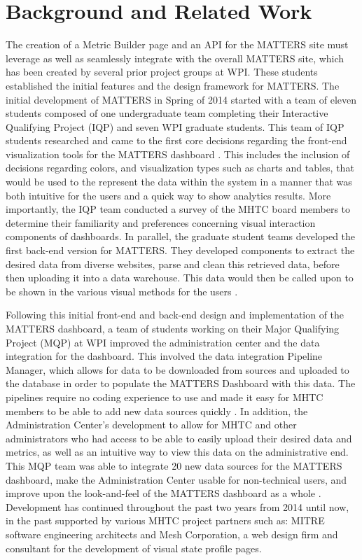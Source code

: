\chapter{Background and Related Work}

	The creation of a Metric Builder page and an API for the MATTERS site must 
	leverage as well as seamlessly integrate with the overall MATTERS site, 
	which has been created by several prior project groups at WPI. These 
	students established the initial features and the design framework 
	for MATTERS. The initial development of MATTERS in Spring of 2014 
	started with a team of eleven students composed of one undergraduate team 
	completing their Interactive Qualifying Project (IQP) and seven WPI graduate 
	students. This team of IQP students researched and came to the first core 
	decisions regarding the front-end visualization tools for the MATTERS 
	dashboard \cite{prevreport}. This includes the inclusion of decisions 
	regarding colors, and visualization types such as charts and tables, that 
	would be used to the represent the data within the system in a manner that 
	was both intuitive for the users and a quick way to show analytics results. 
	More importantly, the IQP team conducted a survey of the MHTC board members 
	to determine their familiarity and preferences concerning visual interaction 
	components of dashboards. In parallel, the graduate student teams developed 
	the first back-end version for MATTERS. They developed components to extract 
	the desired data from diverse websites, parse and clean this retrieved data, 
	before then uploading it into a data warehouse. This data would then be 
	called upon to be shown in the various visual methods for the users 
	\cite{iqp}.

	Following this initial front-end and back-end design and implementation of 
	the MATTERS dashboard, a team of students working on their Major Qualifying 
	Project (MQP) at WPI improved the administration center and the data 
	integration for the dashboard. This involved the data integration Pipeline 
	Manager, which allows for data to be downloaded from sources and uploaded to the database in order to populate the MATTERS Dashboard with this data. The pipelines require no coding experience to use and made it easy for MHTC members to be able to add new data sources quickly \cite{prevreport}. In addition, the Administration Center's development to allow for 
	MHTC and other administrators who had access to be able to easily upload 
	their desired data and metrics, as well as an intuitive way to view this 
	data on the administrative end. This MQP team was able to integrate 20 new 
	data sources for the MATTERS dashboard, make the Administration Center 
	usable for non-technical users, and improve upon the look-and-feel of the 
	MATTERS dashboard as a whole \cite{iqp}. Development has continued throughout the past two years from 2014 until now, in the past supported by various MHTC project partners such as: MITRE software engineering architects and Mesh Corporation, a web design firm and consultant for the development of visual state profile pages. 

